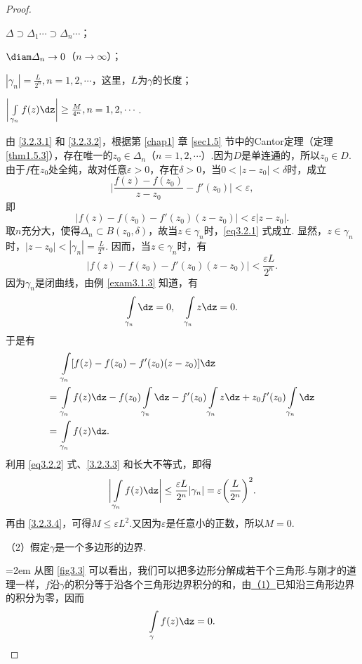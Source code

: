 \begin{proof}
\begin{eenum}
  \item \label{3.2.3.1}$\varDelta\supset\varDelta_1\cdots\supset\varDelta_n\cdots$；
  \item \label{3.2.3.2} $\diam\varDelta_n\to0$（$n\to\infty$）；
  \item \label{3.2.3.3}$|\gamma_n|=\frac{L}{2^n},n=1,2,\cdots$，这里，$L$为$\gamma$的长度；
  \item \label{3.2.3.4}$\bigg|\int\limits_{\gamma_n}f(z)\dz\bigg|\ge\frac M{4^n},n=1,2,\cdots$.
\end{eenum}

由 \ref{3.2.3.1} 和 \ref{3.2.3.2}，根据第 \ref{chap1} 章 \ref{sec1.5} 节中的Cantor定理（定理 \ref{thm1.5.3}），存在唯一的$z_0\in\varDelta_n$（$n=1,2,\cdots$）.因为$D$是单连通的，所以$z_0\in D$. 由于$f$在$z_0$处全纯，故对任意$\varepsilon>0$，存在$\delta>0$，当$0<|z-z_0|<\delta$时，成立
\begin{equation*}
\bigg|\frac{f(z)-f(z_0)}{z-z_0}-f'(z_0)\bigg|<\varepsilon,
\end{equation*}
即
\begin{equation}\label{eq3.2.1}
|f(z)-f(z_0)-f'(z_0)(z-z_0)|<\varepsilon|z-z_0|.
\end{equation}
取$n$充分大，使得$\varDelta_n\subset B(z_0,\delta)$，故当$z\in\gamma_n$时，\eqref{eq3.2.1} 式成立. 显然，$z\in\gamma_n$时，$|z-z_0|<|\gamma_n|=\frac L{2^n}$. 因而，当$z\in\gamma_n$时，有
\begin{equation}\label{eq3.2.2}
|f(z)-f(z_0)-f'(z_0)(z-z_0)|<\frac{\varepsilon L}{2^n}.
\end{equation}
因为$\gamma_n$是闭曲线，由例 \ref{exam3.1.3} 知道，有
\[\int\limits_{\gamma_n}\dz=0,\quad\int\limits_{\gamma_n}z\dz=0.\]
于是有
\begin{align*}
   &\int\limits_{\gamma_n}[f(z)-f(z_0)-f'(z_0)(z-z_0)]\dz\\
={}&\int\limits_{\gamma_n}f(z)\dz-f(z_0)\int\limits_{\gamma_n}\dz
-f'(z_0)\int\limits_{\gamma_n}z\dz+z_0f'(z_0)\int\limits_{\gamma_n}\dz\\
={}&\int\limits_{\gamma_n}f(z)\dz.
\end{align*}
利用 \eqref{eq3.2.2} 式、\ref{3.2.3.3} 和长大不等式，即得
\[\bigg|\int\limits_{\gamma_n}f(z)\dz\bigg|\le\frac{\varepsilon L}{2^n}|\gamma_n|
  = \varepsilon\bigg(\frac{L}{2^n}\bigg)^2.\]
再由 \ref{3.2.3.4}，可得$M\le\varepsilon L^2$.又因为$\varepsilon$是任意小的正数，所以$M=0$.

（2）假定$\gamma$是一个多边形的边界.\\[2mm]
\noindent\begin{minipage}{0.7\textwidth}\parindent=2em
从图 \ref{fig3.3} 可以看出，我们可以把多边形分解成若干个三角形.与刚才的道理一样，$f$沿$\gamma$的积分等于沿各个三角形边界积分的和，由\hyperlink{thm3.2.3.1}{（1）}已知沿三角形边界的积分为零，因而
\[\int\limits_\gamma f(z)\dz=0.\]


\end{minipage}
\end{proof}
